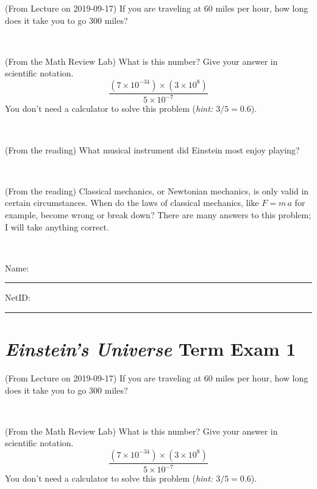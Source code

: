\documentclass[12pt, letterpaper]{article}
\begin{document}
\clearpage


\begin{problem} (From Lecture on 2019-09-17)
If you are traveling at 60 miles per hour, how long does
it take you to go 300 miles?
\end{problem}


\vfill ~

\begin{problem} (From the Math Review Lab)
What is this number? Give your answer in scientific notation.
$$
\frac{(7\times10^{-34})\times(3\times10^8)}{5\times10^{-7}}
$$
You don't need a calculator to solve this problem (\textit{hint: $3/5=0.6$}).
\end{problem}


\vfill ~

\begin{problem} (From the reading)
What musical instrument did Einstein most enjoy playing?
\end{problem}


\vfill ~

\begin{problem} (From the reading)
Classical mechanics, or Newtonian mechanics, is only valid in certain
circumstances. When do the laws of classical mechanics, like $F =
m\,a$ for example, become wrong or break down? There are many answers
to this problem; I will take anything correct.
\end{problem}


\vfill ~


\cleardoublepage



\noindent
Name: \rule[-1ex]{0.60\textwidth}{0.1pt}
NetID: \rule[-1ex]{0.20\textwidth}{0.1pt}

\section*{\textsl{Einstein's Universe} Term Exam 1}
\setcounter{problem}{1}


\begin{problem} (From Lecture on 2019-09-17)
If you are traveling at 60 miles per hour, how long does
it take you to go 300 miles?
\end{problem}


\vfill ~

\begin{problem} (From the Math Review Lab)
What is this number? Give your answer in scientific notation.
$$
\frac{(7\times10^{-34})\times(3\times10^8)}{5\times10^{-7}}
$$
You don't need a calculator to solve this problem (\textit{hint: $3/5=0.6$}).
\end{problem}
\end{document}
